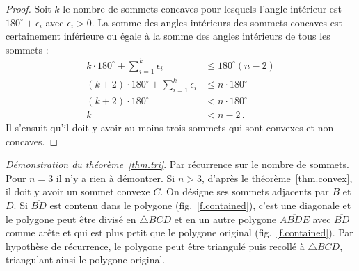 \begin{proof} Soit $k$ le nombre de sommets concaves pour lesquels l'angle intérieur est $180^\circ+\epsilon_i$ avec $\epsilon_i>0$. La somme des angles intérieurs des sommets concaves est certainement inférieure ou égale à la somme des angles intérieurs de tous les sommets :
%
\begin{align*}
k\cdot 180^\circ +\displaystyle\sum_{i=1}^{k}\epsilon_i &\leq 180^\circ(n-2)\\
(k+2)\cdot 180^\circ +\displaystyle\sum_{i=1}^{k}\epsilon_i &\leq n\cdot 180^\circ\\
(k+2)\cdot 180^\circ &< n\cdot 180^\circ\\
k&<n-2\,.
\end{align*}
Il s'ensuit qu'il doit y avoir au moins trois sommets qui sont convexes et non concaves.
\end{proof}

\noindent \emph{Démonstration du théorème~\ref{thm.tri}}. 
Par récurrence sur le nombre de sommets. Pour $n=3$ il n'y a rien à démontrer. Si $n>3$, d'après le théorème~\ref{thm.convex}, il doit y avoir un sommet convexe $C$. On désigne ses sommets adjacents par $B$ et $D$. Si $\overline{BD}$ est contenu dans le polygone (fig.~\ref{f.contained}), c'est une diagonale et le polygone peut être divisé en $\triangle BCD$ et en un autre polygone $\overline{ABDE}$ avec $\overline{BD}$ comme arête et qui est plus petit que le polygone original (fig.~\ref{f.contained}). Par hypothèse de récurrence, le polygone peut être triangulé puis recollé à $\triangle BCD$, triangulant ainsi le polygone original.

\vspace{0.4cm}


